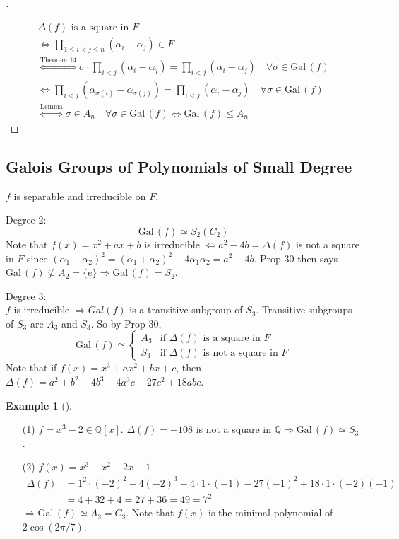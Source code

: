 \documentclass{article}
\theoremstyle{definition}
\newtheorem{ex}{Example}
\newenvironment{proofs}[1][\proofname]{%
  \begin{proof}[#1]$ $\par\nobreak\ignorespaces
}{%
  \end{proof}
}
\newenvironment{exs}[1][]{%
  \begin{ex}[#1]$ $\par\nobreak\ignorespaces
}{%
  \end{ex}
}
\newcommand{\QQ}{\mathbb Q}
\newcommand{\Ra}{\Rightarrow}
\newcommand{\Lra}{\Leftrightarrow}
\newcommand{\Gal}{\text{Gal}\,}
\begin{document}
\begin{proofs}
	\begin{gather*}
		\Delta (f) \text{ is a square in } F \\
		\Lra \prod_{1 \leq i < j \leq n} (\alpha_i - \alpha_j) \in F\\ 
		\stackrel{\text{Theorem 14}}{\Lra} \sigma \cdot \prod_{i < j} (\alpha_i - \alpha_j) = \prod_{i < j} (\alpha_i - \alpha_j) \quad \forall \sigma \in \Gal(f)\\
		\Lra  \prod_{i < j} (\alpha_{\sigma(i)} - \alpha_{\sigma(j)}) = \prod_{i < j} (\alpha_i - \alpha_j) \quad \forall \sigma \in \Gal(f)\\
		\stackrel{\text{Lemma}}{\Lra} \sigma \in A_n \quad \forall \sigma \in \Gal(f) \Lra \Gal(f) \leq A_n
	\end{gather*}
\end{proofs}

\subsection*{Galois Groups of Polynomials of Small Degree}

$f$ is separable and irreducible on $F$.

\par Degree 2:
\[
	\Gal(f) \simeq S_2 (C_2)
\]
Note that $f(x) = x^2 + ax + b$ is irreducible $\Lra a^2 - 4b = \Delta(f)$ is not a square in $F$ since $(\alpha_1 - \alpha_2)^2 = (\alpha_1 + \alpha_2)^2 - 4 \alpha_1 \alpha_2 = a^2 - 4b$.
Prop 30 then says $\Gal(f) \nsubseteq A_2 = \{e\} \Ra \Gal(f) = S_2$.

\par Degree 3:\\
$f$ is irreducible $\Ra Gal(f)$ is a transitive subgroup of $S_3$.
Transitive subgroups of $S_3$ are $A_3$ and $S_3$.
So by Prop 30, 
\[
	\Gal(f) \simeq
	\begin{cases}
		A_3 & \text{if } \Delta(f) \text{ is a square in }F\\
		S_3 & \text{if } \Delta(f) \text{ is not a square in }F
	\end{cases}
\]
Note that if $f(x) = x^3 + ax^2 + bx + c$, then $\Delta(f) = a^2 + b^2 - 4 b^3 - 4 a^3 c - 27c^2 + 18 abc$.

\begin{exs}
	\begin{enumerate}
		\item[(1)] $f = x^3 - 2 \in \QQ[x]$.
			$\Delta(f) = - 108$ is not a square in $\QQ \Ra \Gal(f) \simeq S_3$.

		\item[(2)] $f(x) = x^3 + x^2 - 2x - 1$
			\[
				\begin{split}
					\Delta(f) &= 1^2 \cdot (-2)^2 - 4 (-2)^3 - 4 \cdot 1 \cdot (-1) - 27 (-1)^2 + 18 \cdot 1 \cdot (-2)(-1)\\
					&= 4 + 32 + 4 = 27 + 36 = 49 = 7^2
				\end{split}
			\]
			$\Ra \Gal(f) \simeq A_3 = C_3$.
			Note that $f(x)$ is the minimal polynomial of $2 \cos (2 \pi/7)$.

	\end{enumerate}
\end{exs}
\end{document}
